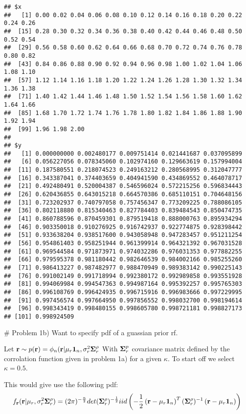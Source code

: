 \documentclass[]{article}
\begin{document}
\begin{verbatim}
## $x
##   [1] 0.00 0.02 0.04 0.06 0.08 0.10 0.12 0.14 0.16 0.18 0.20 0.22 0.24 0.26
##  [15] 0.28 0.30 0.32 0.34 0.36 0.38 0.40 0.42 0.44 0.46 0.48 0.50 0.52 0.54
##  [29] 0.56 0.58 0.60 0.62 0.64 0.66 0.68 0.70 0.72 0.74 0.76 0.78 0.80 0.82
##  [43] 0.84 0.86 0.88 0.90 0.92 0.94 0.96 0.98 1.00 1.02 1.04 1.06 1.08 1.10
##  [57] 1.12 1.14 1.16 1.18 1.20 1.22 1.24 1.26 1.28 1.30 1.32 1.34 1.36 1.38
##  [71] 1.40 1.42 1.44 1.46 1.48 1.50 1.52 1.54 1.56 1.58 1.60 1.62 1.64 1.66
##  [85] 1.68 1.70 1.72 1.74 1.76 1.78 1.80 1.82 1.84 1.86 1.88 1.90 1.92 1.94
##  [99] 1.96 1.98 2.00
## 
## $y
##   [1] 0.000000000 0.002480177 0.009751414 0.021441687 0.037095899
##   [6] 0.056227056 0.078345060 0.102974160 0.129663619 0.157994004
##  [11] 0.187580551 0.218074523 0.249163212 0.280568995 0.312047777
##  [16] 0.343387041 0.374403659 0.404941590 0.434869552 0.464078717
##  [21] 0.492480491 0.520004387 0.546596024 0.572215256 0.596834443
##  [26] 0.620436855 0.643015218 0.664570386 0.685110151 0.704648156
##  [31] 0.723202937 0.740797058 0.757456347 0.773209225 0.788086105
##  [36] 0.802118880 0.815340463 0.827784403 0.839484543 0.850474735
##  [41] 0.860788596 0.870459301 0.879519418 0.888000763 0.895934294
##  [46] 0.903350018 0.910276925 0.916742937 0.922774875 0.928398442
##  [51] 0.933638204 0.938517600 0.943058948 0.947283457 0.951211254
##  [56] 0.954861403 0.958251944 0.961399914 0.964321392 0.967031528
##  [61] 0.969544584 0.971873971 0.974032286 0.976031353 0.977882255
##  [66] 0.979595378 0.981180442 0.982646539 0.984002166 0.985255260
##  [71] 0.986413227 0.987482977 0.988470949 0.989383142 0.990225143
##  [76] 0.991002149 0.991718994 0.992380172 0.992989858 0.993551928
##  [81] 0.994069984 0.994547363 0.994987164 0.995392257 0.995765303
##  [86] 0.996108769 0.996424935 0.996715916 0.996983666 0.997229995
##  [91] 0.997456574 0.997664950 0.997856552 0.998032700 0.998194614
##  [96] 0.998343419 0.998480155 0.998605780 0.998721181 0.998827173
## [101] 0.998924509
\end{verbatim}

\# Problem 1b) Want to specify pdf of a guassian prior rf.

Let
\(\boldsymbol{\mathbf{r}} \sim p(\boldsymbol{\mathbf{r}}) = \phi_n(\boldsymbol{\mathbf{r}} | \mu_r\boldsymbol{\mathbf{1}}_n, \sigma^2_r \boldsymbol{\mathbf{\Sigma}}_r^\rho\)
With \(\boldsymbol{\mathbf{\Sigma}}_r^p\) covariance matrix defined by the corrolation
function given in problem 1a) for a given \(\kappa\). To start off we
select \(\kappa = 0.5\).

This would give use the following pdf:
\[f_{\boldsymbol{\mathbf{r}}}(\boldsymbol{\mathbf{r}} | \mu_r, \sigma_r^2\boldsymbol{\mathbf{\Sigma}}_r^\rho)= (2\pi)^{-\frac{n}{2}}det(\boldsymbol{\mathbf{\Sigma}}_r^\rho)^{-\frac{1}{2}}iid\left(-\frac{1}{2}\left(\boldsymbol{\mathbf{r}} - \mu_r\boldsymbol{\mathbf{1}}_n\right)^T(\boldsymbol{\mathbf{\Sigma}}_r^\rho)^{-1}\left(\boldsymbol{\mathbf{r}} - \mu_r\boldsymbol{\mathbf{1}}_n\right)\right)\]
\end{document}
